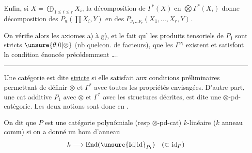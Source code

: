 Enfin, si $X=\bigoplus_{1\leq i\leq r}X_i$, la décomposition
de $\Gamma^*(X)$ en  $\bigotimes\Gamma^*(X_i)$ donne
 décomposition des $P_n(\prod X_i,Y)$ en
des $P_{\nu_1\ldots\nu_r}(X_1,\ldots,X_r,Y)$.

On vérifie alors les axiomes
a) à g), et le fait qu'
les produits tensoriels de $P_1$
sont \uline{stricts}  $\unsure{\theta|0|\otimes}$ (nb quelcon. de
facteurs), que les $\Gamma^{\nu_i}$ existent et
satisfont la condition énoncée précédemment \dots.

\medskip\noindent\hfil\rule{4cm}{0.4pt}\hfil\par

Une catégorie   est dite
\uline{stricte} si elle satisfait aux
conditions préliminaires permettant
de définir $\otimes$ et $\Gamma^*$ avec toutes les
propriétés envisagées. D'autre part,
une cat additive $P_{1}$ avec $\otimes$ et $\Gamma^*$
avec les structures décrites, est
dite une $\otimes$-pd-catégorie. Les
deux notions sont donc en .

On dit que $P$ est  une
catégorie polynômiale (resp $\otimes$-pd-cat)
$k$-linéaire ($k$ anneau comm)
si on a donné un hom d'anneau
\[
k\longrightarrow\operatorname{End}(\unsure{\mathrm{Id}|\mathrm{id}}_{P_1})\quad(\subset\mathrm{id}_P)
\]
